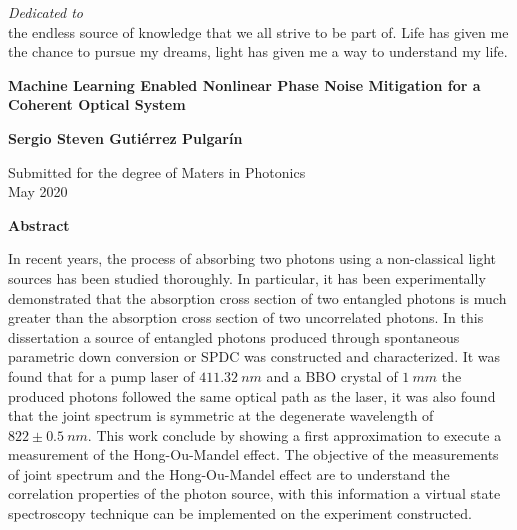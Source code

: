 \newpage
{}

\thispagestyle{empty}
\begin{center}
 \vspace*{2cm}
  \textit{\LARGE {Dedicated to}}\\ 
the endless source of knowledge that we all strive to be part of. Life has given me the chance to pursue my dreams, light has given me a way to understand my life. 



\end{center}


\newpage
\thispagestyle{empty}
\begin{center}
  \textbf{\large Machine Learning Enabled Nonlinear Phase Noise Mitigation for a Coherent Optical System}

  \vspace*{1cm}
  \textbf{\normalsize Sergio Steven Guti\'errez Pulgar\'in}

  \vspace*{0.5cm}
  {\normalsize Submitted for the degree of Maters in Photonics\\ May 2020}

  \vspace*{1cm}
  \textbf{\large Abstract}
\end{center}

In recent years, the process of absorbing two photons using a non-classical light sources has been studied thoroughly. In particular, it has been experimentally demonstrated that the absorption cross section of two entangled photons is much greater than the absorption cross section of two uncorrelated photons. In this dissertation a source of entangled photons produced through spontaneous parametric down conversion or SPDC was constructed and characterized. It was found that for a pump laser of $411.32~nm$ and a BBO crystal of $1~mm$ the produced photons followed the same optical path as the laser, it was also found that the joint spectrum is symmetric at the degenerate wavelength of $822\pm0.5~nm$. This work conclude by showing a first approximation to execute a measurement of the Hong-Ou-Mandel effect. The objective of the measurements of joint spectrum and the Hong-Ou-Mandel effect are to understand the correlation properties of the photon source, with this information a virtual state spectroscopy technique can be implemented on the experiment constructed. 


